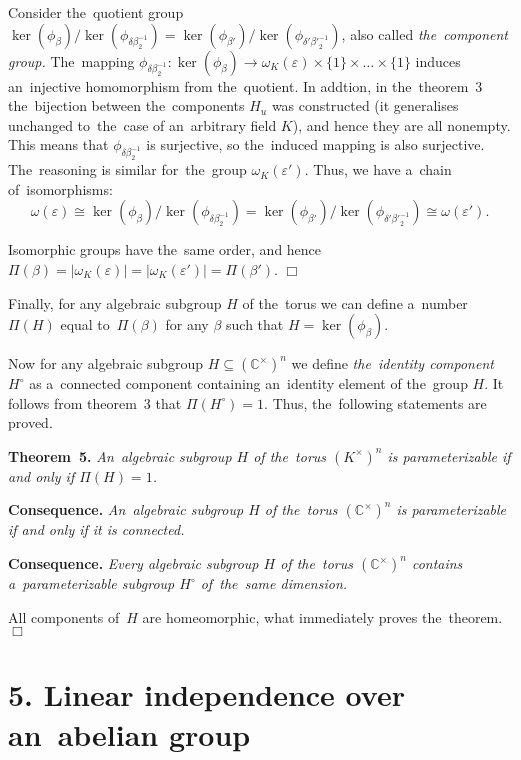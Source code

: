 \documentclass[twoside]{article}
\begin{document}
    Consider the~quotient group $\ker(\phi_\beta) / \ker(\phi_{\delta \beta_2^{-1}}) = \ker(\phi_{\beta'}) / \ker(\phi_{\delta' {\beta'}_2^{-1}})$,
    also called \textit{the~component group.} The~mapping $\phi_{\delta \beta_2^{-1}} : \ker(\phi_\beta) \rightarrow \omega_K(\varepsilon) \times \{ 1 \} \times \ldots \times \{ 1 \}$
    induces an~injective homomorphism from the~quotient. In addtion, in the~theorem~3 the~bijection between the~components $H_u$
    was constructed (it generalises unchanged to~the~case of an~arbitrary field $K$), and hence they are all nonempty.
    This means that $\phi_{\delta \beta_2^{-1}}$ is surjective, so the~induced mapping is also surjective.
    The~reasoning is similar for~the~group $\omega_K(\varepsilon')$. Thus, we have a~chain of~isomorphisms:
    $$
        \omega(\varepsilon) \cong \ker(\phi_\beta) / \ker(\phi_{\delta \beta_2^{-1}}) = \ker(\phi_{\beta'}) / \ker(\phi_{\delta' {\beta'}_2^{-1}}) \cong \omega(\varepsilon').
    $$

    Isomorphic groups have the~same order, and hence $\Pi(\beta) = |\omega_K(\varepsilon)| = |\omega_K(\varepsilon')| = \Pi(\beta')$.
\hfill$\Box$\medskip

Finally, for any algebraic subgroup $H$ of the~torus we can define a~number $\Pi(H)$ equal to~$\Pi(\beta)$
for any $\beta$ such that $H = \ker(\phi_\beta)$.

Now for any algebraic subgroup $H \subseteq (\mathbb{C}^\times)^n$ we define \textit{the~identity component} $H^\circ$
as a~connected component containing an~identity element of the~group $H$. It follows from theorem~3
that $\Pi(H^\circ) = 1$. Thus, the~following statements are proved.

\medskip\noindent\textbf{Theorem~5.}\emph{
    An~algebraic subgroup $H$ of the~torus $(K^\times)^n$ is parameterizable if and only if $\Pi(H) = 1$.
}

\medskip\noindent\textbf{Consequence.}\emph{
    An~algebraic subgroup $H$ of the~torus $(\mathbb{C}^\times)^n$ is parameterizable if and only if it is connected.
}

\medskip\noindent\textbf{Consequence.}\emph{
    Every algebraic subgroup $H$ of the~torus $(\mathbb{C}^\times)^n$ contains a~parameterizable subgroup $H^\circ$ of~the~same dimension.
}\medskip

    All components of~$H$ are homeomorphic, what immediately proves the~theorem.
\hfill$\Box$\medskip

\section*{5. Linear independence over an~abelian group}
\end{document}
